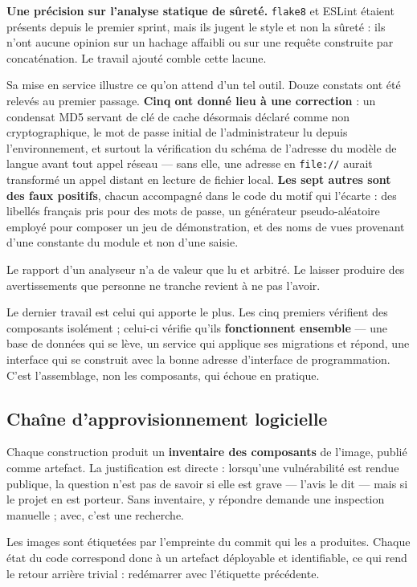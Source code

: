 \documentclass[11pt,a4paper]{article}
\begin{document}
\vspace{2mm}
\noindent\textbf{Une précision sur l'analyse statique de sûreté.} \texttt{flake8} et
ESLint étaient présents depuis le premier sprint, mais ils jugent le style et
non la sûreté : ils n'ont aucune opinion sur un hachage affaibli ou sur une
requête construite par concaténation. Le travail ajouté comble cette lacune.

Sa mise en service illustre ce qu'on attend d'un tel outil. Douze constats ont
été relevés au premier passage. \textbf{Cinq ont donné lieu à une correction} :
un condensat MD5 servant de clé de cache désormais déclaré comme non
cryptographique, le mot de passe initial de l'administrateur lu depuis
l'environnement, et surtout la vérification du schéma de l'adresse du modèle de
langue avant tout appel réseau --- sans elle, une adresse en \texttt{file://}
aurait transformé un appel distant en lecture de fichier local. \textbf{Les sept
autres sont des faux positifs}, chacun accompagné dans le code du motif qui
l'écarte : des libellés français pris pour des mots de passe, un générateur
pseudo-aléatoire employé pour composer un jeu de démonstration, et des noms de
vues provenant d'une constante du module et non d'une saisie.

Le rapport d'un analyseur n'a de valeur que lu et arbitré. Le laisser produire
des avertissements que personne ne tranche revient à ne pas l'avoir.

\medskip
\noindent Le dernier travail est celui qui apporte le plus. Les cinq premiers vérifient des composants isolément ; celui-ci vérifie qu'ils \textbf{fonctionnent ensemble} --- une base de données qui se lève, un service qui applique ses migrations et répond, une interface qui se construit avec la bonne adresse d'interface de programmation. C'est l'assemblage, non les composants, qui échoue en pratique.

\subsection{Chaîne d'approvisionnement logicielle}
Chaque construction produit un \textbf{inventaire des composants} de l'image, publié comme artefact. La justification est directe : lorsqu'une vulnérabilité est rendue publique, la question n'est pas de savoir si elle est grave --- l'avis le dit --- mais si le projet en est porteur. Sans inventaire, y répondre demande une inspection manuelle ; avec, c'est une recherche.

Les images sont étiquetées par l'empreinte du commit qui les a produites. Chaque état du code correspond donc à un artefact déployable et identifiable, ce qui rend le retour arrière trivial : redémarrer avec l'étiquette précédente.
\end{document}
